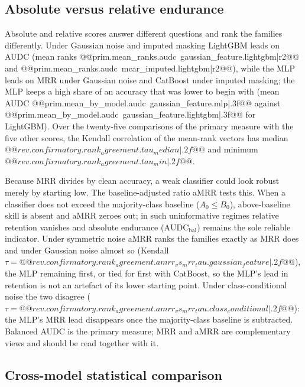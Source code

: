 \documentclass[pdflatex,sn-mathphys]{sn-jnl}
\theoremstyle{thmstyleone}
\theoremstyle{thmstyletwo}
\theoremstyle{thmstylethree}
\newcommand{\AUDC}{\mathrm{AUDC}}
\newcommand{\aMRR}{\mathrm{aMRR}}
\begin{document}



\subsection{Absolute versus relative endurance}\label{sec:res:absrel}

Absolute and relative scores answer different questions and rank the families differently. Under Gaussian noise and imputed masking LightGBM leads on AUDC (mean ranks @@{prim.mean_ranks.audc~gaussian_feature.lightgbm|r2}@@ and @@{prim.mean_ranks.audc~mcar_imputed.lightgbm|r2}@@), while the MLP leads on MRR under Gaussian noise and CatBoost under imputed masking; the MLP keeps a high share of an accuracy that was lower to begin with (mean AUDC @@{prim.mean_by_model.audc~gaussian_feature.mlp|.3f}@@ against @@{prim.mean_by_model.audc~gaussian_feature.lightgbm|.3f}@@ for LightGBM). Over the twenty-five comparisons of the primary measure with the five other scores, the Kendall correlation of the mean-rank vectors has median $@@{rev.confirmatory.rank_agreement.tau_median|.2f}@@$ and minimum $@@{rev.confirmatory.rank_agreement.tau_min|.2f}@@$.

Because MRR divides by clean accuracy, a weak classifier could look robust merely by starting low. The baseline-adjusted ratio aMRR tests this. When a classifier does not exceed the majority-class baseline ($A_0 \le B_0$), above-baseline skill is absent and $\aMRR$ zeroes out; in such uninformative regimes relative retention vanishes and absolute endurance ($\AUDC_{\mathrm{bal}}$) remains the sole reliable indicator. Under symmetric noise aMRR ranks the families exactly as MRR does and under Gaussian noise almost so (Kendall $\tau=@@{rev.confirmatory.rank_agreement.amrr_vs_mrr_tau.gaussian_feature|.2f}@@$), the MLP remaining first, or tied for first with CatBoost, so the MLP's lead in retention is not an artefact of its lower starting point. Under class-conditional noise the two disagree ($\tau=@@{rev.confirmatory.rank_agreement.amrr_vs_mrr_tau.class_conditional|.2f}@@$): the MLP's MRR lead disappears once the majority-class baseline is subtracted. Balanced AUDC is the primary measure; MRR and aMRR are complementary views and should be read together with it.

\subsection{Cross-model statistical comparison}\label{sec:res:stats}
\end{document}

